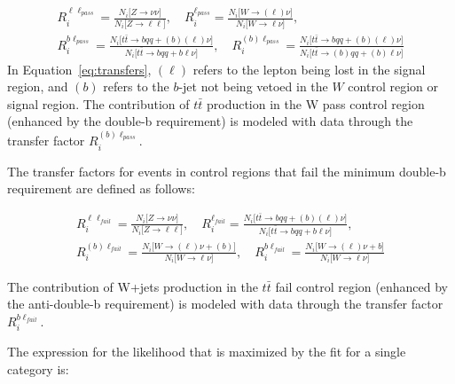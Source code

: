 \begin{gather}
  R_i^{\ell\ell_{pass}} = \frac{N_i\big[Z\rightarrow\nu\nu\big]}{N_i\big[Z\rightarrow\ell\ell\big]}, \quad 
  R_i^{\ell_{pass}} = \frac{N_i\big[W\rightarrow(\ell)\nu\big]}{N_i\big[W\rightarrow\ell\nu\big]}, \quad \nonumber \\
  R_i^{b\ell_{pass}} = \frac{N_i\big[t\bar{t}\rightarrow bqq+(b)(\ell)\nu\big]}{N_i\big[t\bar{t}\rightarrow bqq+b\ell\nu\big]}, \quad 
  R_i^{(b)\ell_{pass}} = \frac{N_i\big[t\bar{t}\rightarrow bqq+(b)(\ell)\nu\big]}{N_i\big[t\bar{t}\rightarrow (b)qq+(b)\ell\nu\big]}
\label{eq:transfers}
\end{gather}
In Equation~\ref{eq:transfers}, $(\ell)$ refers to the lepton being lost in the signal region, and $(b)$ refers to the $b$-jet not being vetoed in the $W$ control region or signal region. The contribution of $t\bar{t}$ production in the W pass control region (enhanced by the double-b requirement) is modeled with data through the transfer factor $R_i^{(b)\ell_{pass}}$.

The transfer factors for events in control regions that fail the minimum double-b requirement are defined as follows:

\begin{gather}
  R_i^{\ell\ell_{fail}} = \frac{N_i\big[Z\rightarrow\nu\nu\big]}{N_i\big[Z\rightarrow\ell\ell\big]}, \quad
  R_i^{\ell_{fail}} = \frac{N_i\big[t\bar{t}\rightarrow bqq+(b)(\ell)\nu\big]}{N_i\big[t\bar{t}\rightarrow bqq+b\ell\nu\big]}, \quad \nonumber \\
  R_i^{(b)\ell_{fail}} = \frac{N_i\big[W\rightarrow(\ell)\nu+(b)\big]}{N_i\big[W\rightarrow\ell\nu\big]}, \quad
  R_i^{b\ell_{fail}} = \frac{N_i\big[W\rightarrow(\ell)\nu+b\big]}{N_i\big[W\rightarrow\ell\nu\big]}
\label{eq:transfers}
\end{gather}

The contribution of W+jets production in the $t\bar{t}$ fail control region (enhanced by the anti-double-b requirement) is modeled with data through the transfer factor $R_i^{b\ell_{fail}}$.


The expression for the likelihood that is maximized by the fit for a single category is:

